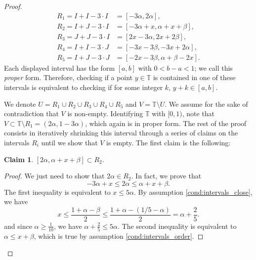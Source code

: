\documentclass{article}
\newtheorem{claim}{Claim}
\begin{document}
\begin{proof}
        \begin{align*}
            R_1 = I + I - 3 \cdot I &= [-3\alpha, 2\alpha], \\
            R_2 = I + J - 3 \cdot I &= [-3 \alpha + x, \alpha + x + \beta], \\
            R_3 = J + J - 3 \cdot I &= [2x - 3\alpha, 2x + 2\beta], \\
            R_4 = I + I - 3 \cdot J &= [-3x - 3\beta,  -3x + 2\alpha], \\
            R_5 = I + J - 3 \cdot J &= [-2x - 3\beta, \alpha + \beta - 2x].
        \end{align*}
        Each displayed interval has the form $[a,b]$ with $0<b-a<1$; we call
        this \emph{proper} form. Therefore, checking if a point $y \in \mathbb{T}$ is contained in one of these intervals
        is equivalent to checking if for some integer $k$, $y + k \in [a, b]$.

        We denote $U = R_1 \cup R_2 \cup R_3 \cup R_4 \cup R_5$ and $V = \mathbb{T} \setminus U$.
        We assume for the sake of contradiction that $V$ is non-empty.
        Identifying $\mathbb{T}$ with $[0,1)$, note that $V \subset \mathbb{T} \setminus R_1 = (2\alpha, 1 - 3\alpha)$, which again is in proper form.
        The rest of the proof consists in iteratively shrinking this interval through a series of claims
        on the intervals $R_i$ until we show that $V$ is empty. The first claim is the following: 

        \begin{claim}
            $[2\alpha, \alpha + x + \beta] \subset R_2$.
        \end{claim}
        \begin{proof}
            We just need to show that $2\alpha \in R_2$.
            In fact, we prove that
            \begin{equation}
                -3\alpha + x \leq 2\alpha \leq \alpha + x + \beta. \label{ineq:R2}
            \end{equation}
            The first inequality is equivalent to $x \leq 5\alpha$.
            By assumption \eqref{cond:intervals_close}, we have 
            \[x \leq \frac{1 + \alpha - \beta}{2} \leq \frac{1 + \alpha - (1/5 - \alpha)}{2} = \alpha + \frac{2}{5}.\]
            and since $\alpha \geq \frac{1}{10}$, we have $\alpha + \frac{2}{5} \leq 5\alpha$.
            The second inequality is equivalent to $\alpha \leq x + \beta$, which is true by assumption \eqref{cond:intervals_order}.
        \end{proof}


\end{proof}
\end{document}
